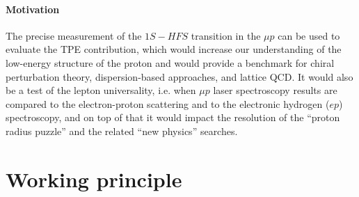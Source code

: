 \documentclass[12pt]{article}
\begin{document}

\paragraph{Motivation}
The precise measurement of the $1S-HFS$ transition in the $\mu{p}$ can be used to evaluate the TPE contribution, which would increase our understanding of the low-energy structure of the proton and would provide a benchmark for chiral perturbation theory, dispersion-based approaches, and lattice QCD. It would also be a test of the lepton universality, i.e. when $\mu{p}$ laser spectroscopy results are compared to the electron-proton scattering and to the electronic hydrogen ($ep$) spectroscopy, and on top of that it would impact the resolution of the ``proton radius puzzle'' and the related ``new physics'' searches. 


\section{Working principle}
\end{document}
